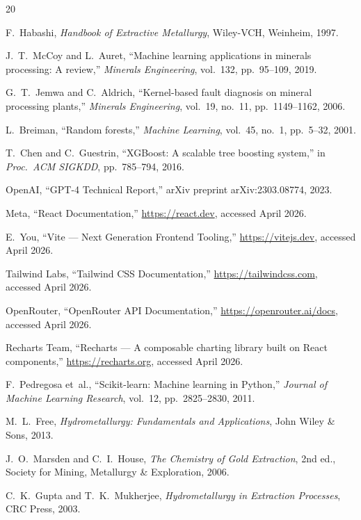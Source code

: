 \documentclass[12pt,a4paper]{report}
\begin{document}
\begin{thebibliography}{20}

F.~Habashi,
\textit{Handbook of Extractive Metallurgy},
Wiley-VCH, Weinheim, 1997.

J.~T.~McCoy and L.~Auret,
``Machine learning applications in minerals processing: A review,''
\textit{Minerals Engineering}, vol.~132, pp.~95--109, 2019.

G.~T.~Jemwa and C.~Aldrich,
``Kernel-based fault diagnosis on mineral processing plants,''
\textit{Minerals Engineering}, vol.~19, no.~11, pp.~1149--1162, 2006.

L.~Breiman,
``Random forests,''
\textit{Machine Learning}, vol.~45, no.~1, pp.~5--32, 2001.

T.~Chen and C.~Guestrin,
``XGBoost: A scalable tree boosting system,''
in \textit{Proc.\ ACM SIGKDD}, pp.~785--794, 2016.

OpenAI,
``GPT-4 Technical Report,''
arXiv preprint arXiv:2303.08774, 2023.

Meta,
``React Documentation,''
\url{https://react.dev}, accessed April 2026.

E.~You,
``Vite — Next Generation Frontend Tooling,''
\url{https://vitejs.dev}, accessed April 2026.

Tailwind Labs,
``Tailwind CSS Documentation,''
\url{https://tailwindcss.com}, accessed April 2026.

OpenRouter,
``OpenRouter API Documentation,''
\url{https://openrouter.ai/docs}, accessed April 2026.

Recharts Team,
``Recharts — A composable charting library built on React components,''
\url{https://recharts.org}, accessed April 2026.

F.~Pedregosa et~al.,
``Scikit-learn: Machine learning in Python,''
\textit{Journal of Machine Learning Research}, vol.~12, pp.~2825--2830, 2011.

M.~L.~Free,
\textit{Hydrometallurgy: Fundamentals and Applications},
John Wiley \& Sons, 2013.

J.~O.~Marsden and C.~I.~House,
\textit{The Chemistry of Gold Extraction},
2nd ed., Society for Mining, Metallurgy \& Exploration, 2006.

C.~K.~Gupta and T.~K.~Mukherjee,
\textit{Hydrometallurgy in Extraction Processes},
CRC Press, 2003.

\end{thebibliography}
\end{document}
